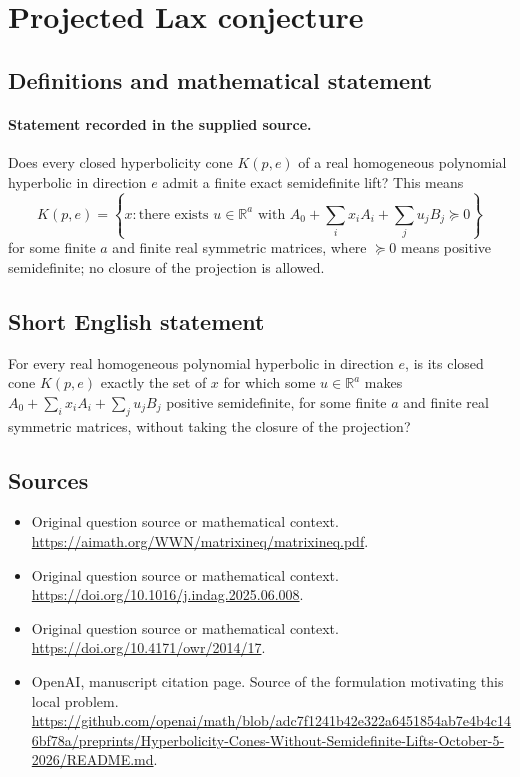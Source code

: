 \documentclass[11pt]{article}
\begin{document}
\section*{Projected Lax conjecture}\label{statement}
\subsection{Definitions and mathematical statement}
\paragraph{Statement recorded in the supplied source.}
Does every closed hyperbolicity cone $K(p,e)$ of a real homogeneous polynomial hyperbolic in direction $e$ admit a finite exact semidefinite lift? This means
\[
K(p,e)=\left\{x:\text{there exists }u\in\mathbb{R}^a\text{ with }A_0+\sum_i x_iA_i+\sum_j u_jB_j\succeq0\right\}
\]
for some finite $a$ and finite real symmetric matrices, where $\succeq0$ means positive semidefinite; no closure of the projection is allowed.
\subsection{Short English statement}
For every real homogeneous polynomial hyperbolic in direction $e$, is its closed cone $K(p,e)$ exactly the set of $x$ for which some $u\in\mathbb{R}^a$ makes $A_0+\sum_i x_iA_i+\sum_j u_jB_j$ positive semidefinite, for some finite $a$ and finite real symmetric matrices, without taking the closure of the projection?
\subsection{Sources}
\begin{itemize}
\item[S1] Original question source or mathematical context.
\url{https://aimath.org/WWN/matrixineq/matrixineq.pdf}.
\item[S2] Original question source or mathematical context.
\url{https://doi.org/10.1016/j.indag.2025.06.008}.
\item[S3] Original question source or mathematical context.
\url{https://doi.org/10.4171/owr/2014/17}.
\item[S4] OpenAI, manuscript citation page. Source of the formulation motivating this local problem.
\url{https://github.com/openai/math/blob/adc7f1241b42e322a6451854ab7e4b4c146bf78a/preprints/Hyperbolicity-Cones-Without-Semidefinite-Lifts-October-5-2026/README.md}.
\end{itemize}
\end{document}
